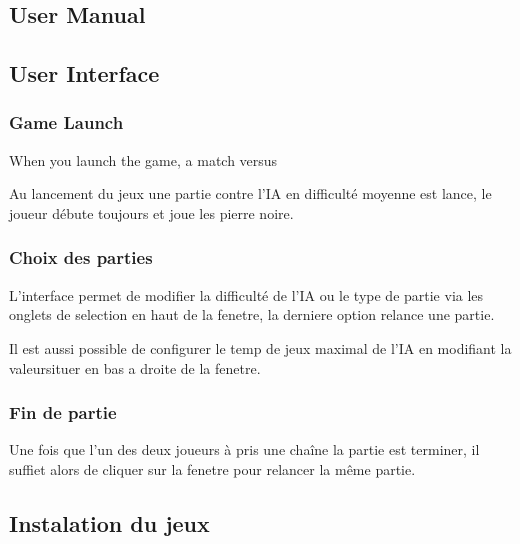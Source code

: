 \documentclass[12pt,a4paper,utf8x]{report}
\begin{document}
\begin{onehalfspace}
\clearpage






\chapter{User Manual}

\section{User Interface}

	\subsection{Game Launch}
		When you launch the game, a match versus 
		
		Au lancement du jeux une partie contre l'IA en difficulté moyenne est lance, le joueur débute toujours et joue les pierre noire.
		
	\subsection{Choix des parties}

		L'interface permet de modifier la difficulté de l'IA ou le type de partie via les onglets de selection en haut de la fenetre, la derniere option relance une partie.
		
		Il est aussi possible de configurer le temp de jeux maximal de l'IA en modifiant la valeursituer en bas a droite de la fenetre.
	
	
	\subsection{Fin de partie}
	
		Une fois que l'un des deux joueurs à pris une chaîne la partie est terminer, il suffiet alors de cliquer sur la fenetre pour relancer la même partie. 
		
		
\section{Instalation du jeux}
	
	
	
\clearpage




\end{onehalfspace}

%
%
%

\printindex

\appendix
\end{document}
